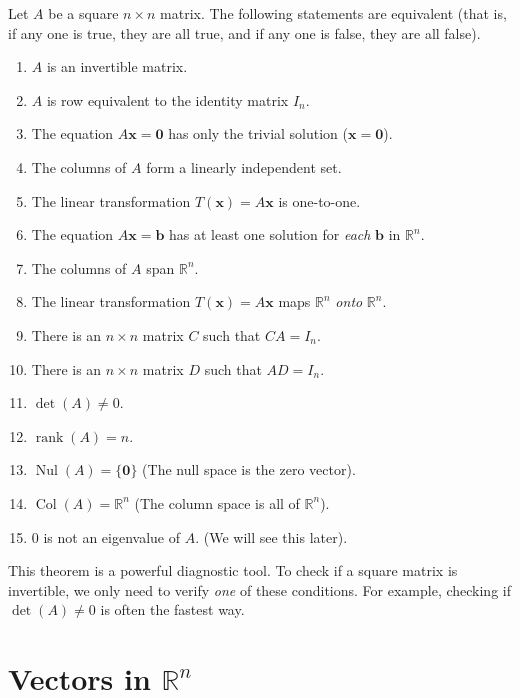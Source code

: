 \begin{theorem}
Let $A$ be a square $n \times n$ matrix. The following statements are equivalent (that is, if any one is true, they are all true, and if any one is false, they are all false).
\begin{enumerate}
    \item $A$ is an invertible matrix.
    \item $A$ is row equivalent to the identity matrix $I_n$.
    \item The equation $A\mathbf{x} = \mathbf{0}$ has only the trivial solution ($\mathbf{x} = \mathbf{0}$).
    \item The columns of $A$ form a linearly independent set.
    \item The linear transformation $T(\mathbf{x}) = A\mathbf{x}$ is one-to-one.
    \item The equation $A\mathbf{x} = \mathbf{b}$ has at least one solution for \emph{each} $\mathbf{b}$ in $\mathbb{R}^n$.
    \item The columns of $A$ span $\mathbb{R}^n$.
    \item The linear transformation $T(\mathbf{x}) = A\mathbf{x}$ maps $\mathbb{R}^n$ \emph{onto} $\mathbb{R}^n$.
    \item There is an $n \times n$ matrix $C$ such that $CA = I_n$.
    \item There is an $n \times n$ matrix $D$ such that $AD = I_n$.
    \item $\det(A) \neq 0$.
    \item $\operatorname{rank}(A) = n$.
    \item $\operatorname{Nul}(A) = \{\mathbf{0}\}$ (The null space is the zero vector).
    \item $\operatorname{Col}(A) = \mathbb{R}^n$ (The column space is all of $\mathbb{R}^n$).
    \item 0 is not an eigenvalue of $A$. (We will see this later).
\end{enumerate}
\end{theorem}

This theorem is a powerful diagnostic tool. To check if a square matrix is invertible, we only need to verify \emph{one} of these conditions. For example, checking if $\det(A) \neq 0$ is often the fastest way.

\section{Vectors in \texorpdfstring{$\mathbb{R}^n$}{R n}}

